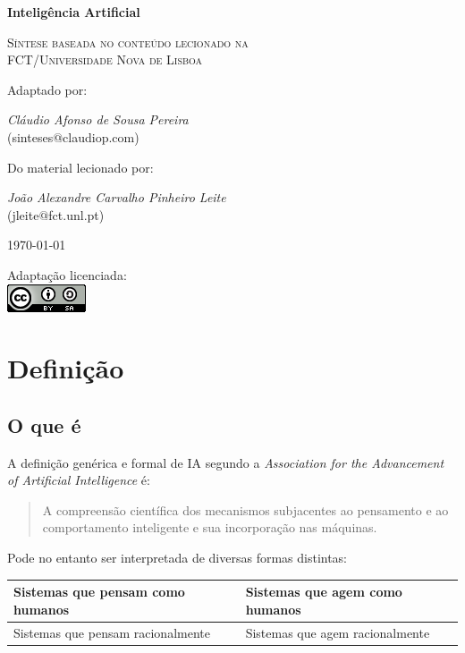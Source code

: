 \documentclass[]{report}
\begin{document}
\begin{titlepage}
	\centering
	\vspace{5cm}
	{\huge\bfseries Inteligência Artificial\par}
	\vspace{1cm}
	{\scshape\Large Síntese baseada no conteúdo lecionado na\\
	 FCT/Universidade Nova de Lisboa\par}
	\vspace{2cm}
	Adaptado por:\\
	{\Large \textit{Cláudio Afonso de Sousa Pereira}\\
	(sinteses$\text{@}$claudiop$.$com)\par}
	\vspace{1cm}
	Do material lecionado por:\\
	{\Large \textit{João Alexandre Carvalho Pinheiro Leite}\\
	(jleite$\text{@}$fct$.$unl$.$pt)\par}
	\vspace{1cm}
	{\large \today\par}
	\vfill
	Adaptação licenciada:\\
	\href{http://creativecommons.org/licenses/by-sa/4.0/}{\includegraphics[scale=0.8]{ccbysa.png}}
\end{titlepage}
\chapter{Definição}
\section{O que é}
A definição genérica e formal de IA segundo a \textit{Association for the Advancement of Artificial Intelligence} é:
\begin{quote}
A compreensão científica dos mecanismos subjacentes ao pensamento e ao comportamento inteligente e sua incorporação nas máquinas.
\end{quote}
Pode no entanto ser interpretada de diversas formas distintas:
\begin{table}[htbp]
\begin{tabular}{l | l}
Sistemas que pensam como humanos & Sistemas que agem como humanos \\ \hline
Sistemas que pensam racionalmente & Sistemas que agem racionalmente \\
\end{tabular}
\end{table}
\end{document}

